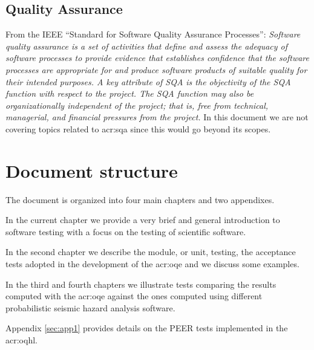 \subsection{Quality Assurance}
From the IEEE ``Standard for Software Quality Assurance Processes'':
\emph{Software quality assurance is a set of activities that define and 
assess the adequacy of software processes to provide evidence that establishes 
confidence that the software processes are appropriate for and produce 
software products of suitable quality for their intended purposes. 
A key attribute of SQA is the objectivity of the SQA function with 
respect to the project. The SQA function may also be organizationally 
independent of the project; that is, free from technical, managerial, 
and financial pressures from the project.} In this document we are not 
covering topics related to \gls{acr:sqa} since this would go beyond its
scopes.  
%
\section{Document structure}
The document is organized into four main chapters and two appendixes.
 
In the current chapter we provide a very brief and general introduction 
to software testing with a focus on the testing of scientific software. 
 
In the second chapter we describe the module, or unit, testing, 
the acceptance tests adopted in the development of the 
\gls{acr:oqe} and we discuss some examples. 
 
In the third and fourth chapters we illustrate tests comparing 
the results computed with the \gls{acr:oqe} against the ones 
computed using different probabilistic seismic hazard analysis 
software.
  
Appendix \ref{sec:app1} provides details on the PEER tests 
implemented in the \gls{acr:oqhl}.
